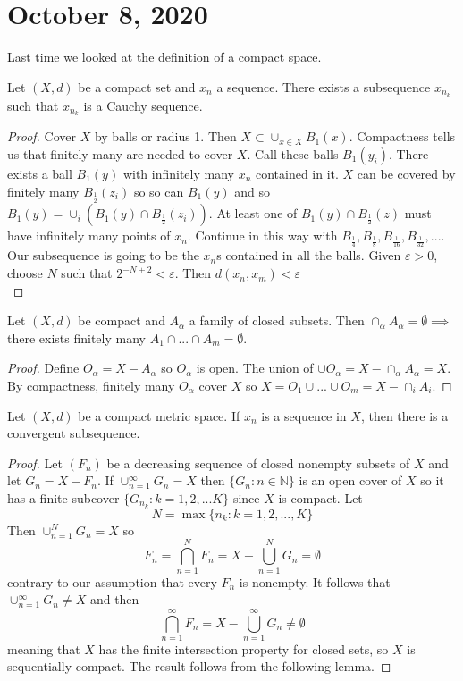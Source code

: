 \documentclass{article}
\newcommand{\N}{\mathbb{N}}
\newcommand{\eps}{\varepsilon}
\begin{document}
\section{October 8, 2020}
Last time we looked at the definition of a compact space.
\begin{theorem}
Let $(X,d)$ be a compact set and $x_n$ a sequence. There exists a subsequence $x_{n_k}$ such that $x_{n_k}$ is a Cauchy sequence.
\end{theorem}
\begin{proof}
Cover $X$ by balls or radius 1. Then $X\subset \cup_{x\in X} B_1(x)$. Compactness tells us that finitely many are needed to cover $X$. Call these balls $B_1(y_i)$. There exists a ball $B_1(y)$ with infinitely many $x_n$ contained in it. $X$ can be covered by finitely many $B_\frac{1}{2}(z_i)$ so so can $B_1(y)$ and so $B_1(y)=\cup_i (B_1(y)\cap B_\frac{1}{2}(z_i))$. At least one of $B_1(y)\cap B_\frac{1}{2}(z)$ must have infinitely many points of $x_n$. Continue in this way with $B_\frac{1}{4}, B_\frac{1}{8}, B_\frac{1}{16}, B_\frac{1}{32},...$. Our subsequence is going to be the $x_n$s contained in all the balls. Given $\eps>0$, choose $N$ such that $2^{-N+2}<\eps$. Then $d(x_n,x_m)<\eps$\\
\end{proof}
\begin{lemma}
Let $(X,d)$ be compact and $A_\alpha$ a family of closed subsets. Then $\cap_\alpha A_\alpha= \emptyset\implies$ there exists finitely many $A_1\cap ...\cap A_m=\emptyset$.
\end{lemma}
\begin{proof}
Define $O_\alpha=X-A_\alpha$ so $O_\alpha$ is open. The union of $\cup O_\alpha=X-\cap_\alpha A_\alpha=X$. By compactness, finitely many $O_\alpha$ cover $X$ so $X=O_1\cup...\cup O_m=X-\cap_i A_i$.
\end{proof}
\begin{theorem}
Let $(X,d)$ be a compact metric space. If $x_n$ is a sequence in $X$, then there is a convergent subsequence.
\end{theorem}
\begin{proof}
Let $(F_n)$ be a decreasing sequence of closed nonempty subsets of $X$ and let $G_n=X-F_n$. If $\cup_{n=1}^\infty G_n=X$ then $\{G_n:n\in \N\}$ is an open cover of $X$ so it has a finite subcover $\{G_{n_k}:k=1,2,...K\}$ since $X$ is compact. Let $$N=\max\{n_k:k=1,2,...,K\}$$ Then $\cup^N_{n=1}G_n=X$ so $$F_n=\bigcap_{n=1}^NF_n=X-\bigcup_{n=1}^NG_n=\emptyset$$ contrary to our assumption that every $F_n$ is nonempty. It follows that $\cup_{n=1}^\infty G_n\neq X$ and then $$\bigcap_{n=1}^\infty F_n=X-\bigcup_{n=1}^\infty G_n\neq\emptyset$$ meaning that $X$ has the finite intersection property for closed sets, so $X$ is sequentially compact. The result follows from the following lemma.
\end{proof}
\end{document}
